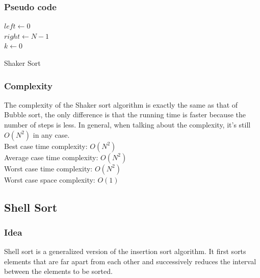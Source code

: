 \documentclass[11pt,a4paper]{article}
\begin{document}
\subsubsection*{Pseudo code}
\begin{algorithm2e}
  \SetAlgoLined
  $left \gets 0$ \\
  $right \gets N-1$ \\
  $k \gets 0$\\
  \caption{Shaker Sort}
\end{algorithm2e}

\subsubsection*{Complexity}
The complexity of the Shaker sort algorithm is exactly the same as that of Bubble sort, the only difference is that the running time is faster 
because the number of steps is less. In general, when talking about the complexity, it's still $O(N^2)$ in any case.\\
Best case time complexity: $O(N^2)$ \\
Average case time complexity: $O(N^2)$\\
Worst case time complexity: $O(N^2)$ \\
Worst case space complexity: $O(1)$

\subsection{Shell Sort}
\subsubsection*{Idea}
Shell sort is a generalized version of the insertion sort algorithm. 
It first sorts elements that are far apart from each other and successively reduces the interval between the elements to be sorted.
\end{document}
